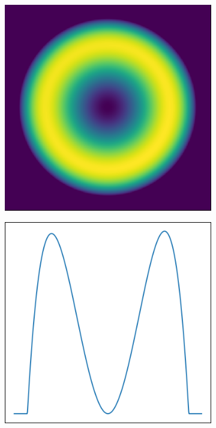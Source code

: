 \begin{figure}[h]
	\centering
	\begin{subfigure}{0.44\textwidth}
		\centering
		\includegraphics[width=1\linewidth, scale=2]{./images/second_moment_combine_mask.png}
		\caption{}
		\label{fig:second_moment_combine_mask}
	\end{subfigure}
	\begin{subfigure}{0.45\textwidth}
		\centering
		\includegraphics[width=1\linewidth, scale=2]{./images/second_moment_combine_mask_cross_section.png}

\end{subfigure}
\end{figure}
